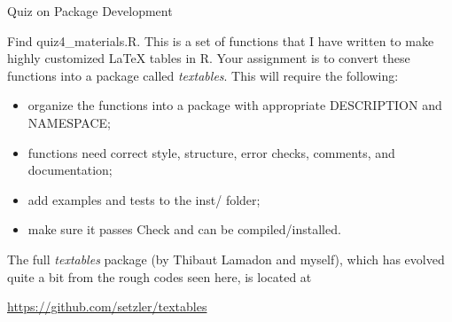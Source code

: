 \documentclass[10pt,ignorenonframetext,]{beamer}
\providecommand{\tightlist}{%
\setlength{\itemsep}{0pt}\setlength{\parskip}{0pt}}
\begin{document}
\begin{frame}{Quiz on Package Development}

Find quiz4\_materials.R. This is a set of functions that I have written
to make highly customized LaTeX tables in R. Your assignment is to
convert these functions into a package called \emph{textables}. This
will require the following:

\begin{itemize}
\tightlist
\item
  organize the functions into a package with appropriate DESCRIPTION and
  NAMESPACE;
\item
  functions need correct style, structure, error checks, comments, and
  documentation;
\item
  add examples and tests to the inst/ folder;
\item
  make sure it passes Check and can be compiled/installed.
\end{itemize}

The full \emph{textables} package (by Thibaut Lamadon and myself), which
has evolved quite a bit from the rough codes seen here, is located at

\url{https://github.com/setzler/textables}

\end{frame}
\end{document}
